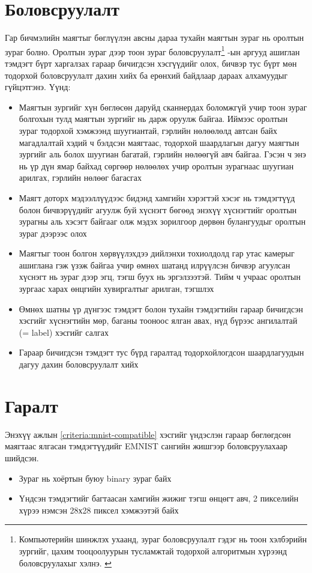 \section{Боловсруулалт}
\label{section:processing}

Гар бичмэлийн маягтыг бөглүүлэн авсны дараа тухайн маягтын зураг нь оролтын зураг болно. Оролтын зураг дээр тоон зураг боловсруулалт\footnote{Компьютерийн шинжлэх ухаанд, зураг боловсруулалт гэдэг нь тоон хэлбэрийн зургийг, цахим тооцоолуурын тусламжтай тодорхой алгоритмын хүрээнд боловсруулахыг хэлнэ. \cite{image-processing}} -ын аргууд ашиглан тэмдэгт бүрт харгалзах гараар бичигдсэн хэсгүүдийг олох, бичвэр тус бүрт мөн тодорхой боловсруулалт дахин хийх ба ерөнхий байдлаар дараах алхамуудыг гүйцэтгэнэ. Үүнд:

\begin{itemize}
	\item Маягтын зургийг хүн бөглөсөн даруйд сканнердах боломжгүй учир тоон зураг болгохын тулд маягтын зургийг нь дарж оруулж байгаа. Иймээс оролтын зураг тодорхой хэмжээнд шуугиантай, гэрлийн нөлөөлөлд автсан байх магадлалтай хэдий ч бэлдсэн маягтаас, тодорхой шаардлагын дагуу маягтын зургийг аль болох шуугиан багатай, гэрлийн нөлөөгүй авч байгаа. Гэсэн ч энэ нь үр дүн ямар байхад сөргөөр нөлөөлөх учир оролтын зурагнаас шуугиан арилгах, гэрлийн нөлөөг багасгах
	\item Маягт доторх мэдээллүүдээс бидэнд хамгийн хэрэгтэй хэсэг нь тэмдэгтүүд болон бичвэрүүдийг агуулж буй хүснэгт бөгөөд энэхүү хүснэгтийг оролтын зурагны аль хэсэгт байгааг олж мэдэх зорилгоор дөрвөн булангуудыг оролтын зураг дээрээс олох
	\item Маягтыг тоон болгон хөрвүүлэхдээ дийлэнхи тохиолдолд гар утас камерыг ашиглана гэж үзэж байгаа учир өмнөх шатанд илрүүлсэн бичвэр агуулсан хүснэгт нь зураг дээр эгц, тэгш буух нь эргэлзээтэй. Тийм ч учраас оролтын зургаас харах өнцгийн хувиргалтыг арилган, тэгшлэх
	\item Өмнөх шатны үр дүнгээс тэмдэгт болон тухайн тэмдэгтийн гараар бичигдсэн хэсгийг хүснэгтийн мөр, баганы тооноос ялган авах, нүд бүрээс ангилалтай (= label) хэсгийг салгах
	\item Гараар бичигдсэн тэмдэгт тус бүрд гаралтад тодорхойлогдсон шаардлагуудын дагуу дахин боловсруулалт хийх
\end{itemize}

\section{Гаралт}

Энэхүү ажлын \ref{criteria:mnist-compatible} хэсгийг үндэслэн гараар бөглөгдсөн маягтаас ялгасан тэмдэгтүүдийг EMNIST сангийн жишгээр боловсруулахаар шийдсэн.

\begin{itemize}
	\item Зураг нь хоёртын буюу binary зураг байх
	\item Үндсэн тэмдэгтийг багтаасан хамгийн жижиг тэгш өнцөгт авч, 2 пикселийн хүрээ нэмсэн 28х28 пиксел хэмжээтэй байх
\end{itemize}